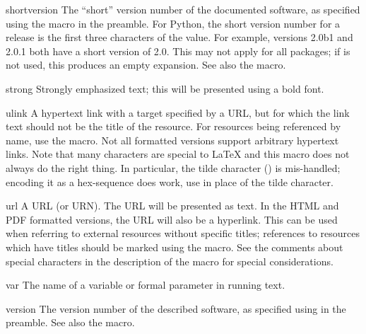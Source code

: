 \documentclass{howto}
\begin{document}
    \begin{macrodesc}{shortversion}{}
      The ``short'' version number of the documented software, as
      specified using the  macro in the
      preamble.  For Python, the short version number for a release is
      the first three characters of the  value.  For
      example, versions 2.0b1 and 2.0.1 both have a short version of
      2.0.  This may not apply for all packages; if
       is not used, this produces an empty
      expansion.  See also the  macro.
    \end{macrodesc}

    \begin{macrodesc}{strong}{}
      Strongly emphasized text; this will be presented using a bold
      font.
    \end{macrodesc}

    \begin{macrodesc}{ulink}{}
      A hypertext link with a target specified by a URL, but for which
      the link text should not be the title of the resource.  For
      resources being referenced by name, use the 
      macro.  Not all formatted versions support arbitrary hypertext
      links.  Note that many characters are special to \LaTeX{} and
      this macro does not always do the right thing.  In particular,
      the tilde character (\character{\~}) is mis-handled; encoding it
      as a hex-sequence does work, use  in place of the
      tilde character.
    \end{macrodesc}

    \begin{macrodesc}{url}{}
      A URL (or URN).  The URL will be presented as text.  In the HTML 
      and PDF formatted versions, the URL will also be a hyperlink.
      This can be used when referring to external resources without
      specific titles; references to resources which have titles
      should be marked using the  macro.  See the
      comments about special characters in the description of the
       macro for special considerations.
    \end{macrodesc}

    \begin{macrodesc}{var}{}
      The name of a variable or formal parameter in running text.
    \end{macrodesc}

    \begin{macrodesc}{version}{}
      The version number of the described software, as specified using
       in the preamble.  See also the
       macro.
    \end{macrodesc}
\end{document}
